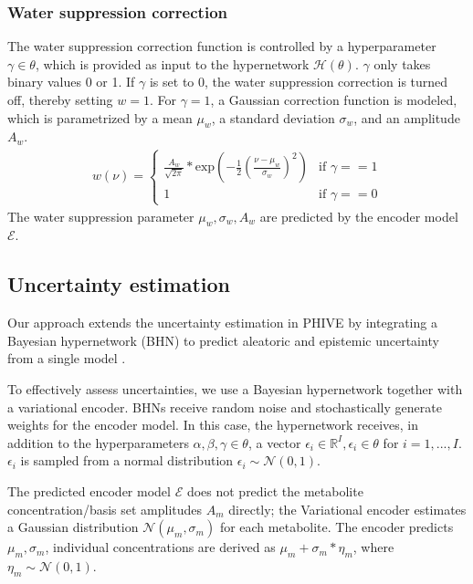 \documentclass{article}
\begin{document}
        \subsubsection{Water suppression correction} \label{sec:watSuppCorr}
            The water suppression correction function is controlled by a hyperparameter $\gamma\in\theta$, which is provided as input to the hypernetwork $\mathcal{H}(\theta)$. $\gamma$ only takes binary values 0 or 1. If $\gamma$ is set to 0, the water suppression correction is turned off, thereby setting $w=1$. For $\gamma=1$, a Gaussian correction function is modeled, which is parametrized by a mean $\mu_w$, a standard deviation $\sigma_w$, and an amplitude $A_w$. 
            \begin{align}
                w(\nu) = 
                \begin{cases}
                    \frac{A_w}{\sqrt{2\pi}} * \text{exp}(-\frac{1}{2} \left(\frac{\nu-\mu_w}{\sigma_w}\right) ^2) & \text{if } \gamma == 1 \\
                    1 & \text{if } \gamma == 0
                \end{cases}
            \end{align}
            The water suppression parameter $\mu_w, \sigma_w, A_w$ are predicted by the encoder model $\mathcal{E}$.
            
            
    \subsection{Uncertainty estimation} \label{sec:uncEst}
        Our approach extends the uncertainty estimation in PHIVE \cite{shamaei2026phive} by integrating a Bayesian hypernetwork (BHN) \cite{ekmekci2023quantifying} to predict aleatoric and epistemic uncertainty from a single model \cite{chan2024estimating}. 

        To effectively assess uncertainties, we use a Bayesian hypernetwork together with a variational encoder. BHNs receive random noise and stochastically generate weights for the encoder model. In this case, the hypernetwork receives, in addition to the hyperparameters $\alpha, \beta,\gamma\in\theta$, a vector $\epsilon_i \in \mathbb{R}^I, \epsilon_i \in\theta$ for $i=1,...,I$. $\epsilon_i$ is sampled from a normal distribution $\epsilon_i \sim \mathcal{N}(0,1)$. 
        
        The predicted encoder model $\mathcal{E}$ does not predict the metabolite concentration/basis set amplitudes $A_m$ directly; the Variational encoder estimates a Gaussian distribution $\mathcal{N}(\mu_m,\sigma_m)$ for each metabolite. The encoder predicts $\mu_m,\sigma_m$, individual concentrations are derived as $\mu_m + \sigma_m*\eta_m$, where $\eta_m \sim \mathcal{N}(0,1)$. 
\end{document}

